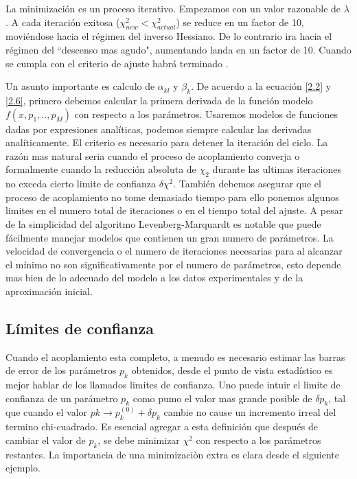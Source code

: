 \documentclass[a4paper,openright,12pt]{book}
\begin{document}
La minimización es un proceso iterativo. Empezamos con un valor razonable de $\lambda$. A cada iteración exitosa ($\chi_{new}^{2}<\chi_{actual}^{2}$) se reduce en un factor de 10, moviéndose hacia el régimen del inverso Hessiano. De lo contrario ira hacia el régimen del  ``descenso mas agudo", aumentando landa en un factor de 10. Cuando se cumpla con el criterio de ajuste habrá terminado .

Un asunto importante es calculo de $\alpha_{kl}$ y $\beta_{k}$. De acuerdo a la ecuación \ref{2.2} y \ref{2.6}, primero debemos calcular la primera derivada de la función modelo $f(x,p_{1},..,p_{M})$ con respecto a los parámetros. Usaremos modelos de funciones dadas por expresiones analíticas, podemos siempre calcular las derivadas analíticamente.
El criterio es necesario para detener la iteración del ciclo. La razón mas natural seria cuando el proceso de acoplamiento converja o formalmente cuando la reducción absoluta de $\chi_{2}$ durante las ultimas iteraciones no exceda cierto limite de confianza $\delta\chi^{2}$. También debemos asegurar que el proceso de acoplamiento no tome demasiado tiempo para ello ponemos algunos limites en el numero total de iteraciones o en el tiempo total del ajuste. A pesar de la simplicidad del algoritmo Levenberg-Marquardt es notable que puede fácilmente manejar modelos que contienen un gran numero de parámetros. La velocidad de convergencia o el numero de iteraciones necesarias para al alcanzar el mínimo no son significativamente por el numero de parámetros, esto depende mas bien de lo adecuado del modelo a los datos experimentales y de  la aproximación inicial\cite{guide}.

\subsection{Límites de confianza}
Cuando el acoplamiento esta completo, a menudo es necesario estimar las barras de error de los parámetros $p_{k}$ obtenidos, desde el punto de vista estadístico es mejor hablar de los llamados limites de confianza. Uno puede intuir el limite de confianza de un parámetro $p_{k}$ como pumo el valor mas grande posible de $\delta p_{k}$, tal que cuando el valor $pk\rightarrow p_{k}^{(0)}+\delta p_{k}$ cambie no cause un incremento irreal del termino chi-cuadrado. Es esencial agregar a esta definición que después de cambiar el valor de $p_{k}$, se debe minimizar $\chi^{2}$ con respecto a los parámetros restantes. La importancia de una minimizaciòn extra es clara desde el siguiente ejemplo\cite{guide}.
\end{document}
